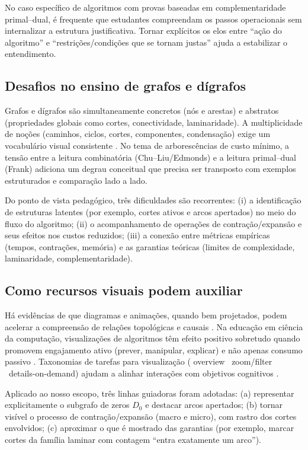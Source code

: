 \documentclass[12pt,a4paper]{article}
\def\emph#1{#1}%
\begin{document}
No caso específico de algoritmos com provas baseadas em complementaridade primal--dual, é frequente que estudantes compreendam os passos operacionais sem internalizar a estrutura justificativa. Tornar explícitos os elos entre “ação do algoritmo” e “restrições/condições que se tornam justas” ajuda a estabilizar o entendimento.

\subsection{Desafios no ensino de grafos e dígrafos}
Grafos e dígrafos são simultaneamente concretos (nós e arestas) e abstratos (propriedades globais como cortes, conectividade, laminaridade). A multiplicidade de noções (caminhos, ciclos, cortes, componentes, condensação) exige um vocabulário visual consistente \cite{bondy2008graph,diestel2017graph,west2001introduction}. No tema de arborescências de custo mínimo, a tensão entre a leitura combinatória (Chu--Liu/Edmonds) e a leitura primal--dual (Frank) adiciona um degrau conceitual que precisa ser transposto com exemplos estruturados e comparação lado a lado.

Do ponto de vista pedagógico, três dificuldades são recorrentes: (i) a identificação de estruturas latentes (por exemplo, cortes ativos e arcos apertados) no meio do fluxo do algoritmo; (ii) o acompanhamento de operações de contração/expansão e seus efeitos nos custos reduzidos; (iii) a conexão entre métricas empíricas (tempos, contrações, memória) e as garantias teóricas (limites de complexidade, laminaridade, complementaridade).

\subsection{Como recursos visuais podem auxiliar}
Há evidências de que diagramas e animações, quando bem projetados, podem acelerar a compreensão de relações topológicas e causais \cite{larkin1987diagram,ware2012information}. Na educação em ciência da computação, visualizações de algoritmos têm efeito positivo sobretudo quando promovem \emph{engajamento ativo} (prever, manipular, explicar) e não apenas consumo passivo \cite{hundhausen2002meta,naps2003engagement}. Taxonomias de tarefas para visualização (
overview \textrightarrow\ zoom/filter \textrightarrow\ details-on-demand) ajudam a alinhar interações com objetivos cognitivos \cite{shneiderman1996eyes}.

Aplicado ao nosso escopo, três linhas guiadoras foram adotadas: (a) representar explicitamente o subgrafo de zeros \(D_0\) e destacar arcos \emph{apertados}; (b) tornar visível o processo de contração/expansão (macro e micro), com rastro dos cortes envolvidos; (c) aproximar o que é mostrado das garantias (por exemplo, marcar cortes da família laminar com contagem “entra exatamente um arco”).
\end{document}
